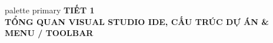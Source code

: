 \documentclass[aspectratio=169, 10pt]{beamer}
\begin{document}
\begin{frame}[plain]
  \vfill
  \centering
  \begin{beamercolorbox}[sep=8pt,center,shadow=true,rounded=true]{palette primary}
    {\Huge \textbf{TIẾT 1}}\\[2mm]
    {\Large \textbf{TỔNG QUAN VISUAL STUDIO IDE, CẤU TRÚC DỰ ÁN \& MENU / TOOLBAR}}
  \end{beamercolorbox}
  \vfill
\end{frame}

\end{document}
